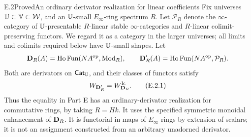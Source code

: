 \begin{claim}{E.2}{Proved}{An ordinary derivator realization for linear coefficients}
Fix universes $\mathbb U\subset\mathbb V\subset\mathcal W$, and an
$\mathbb U$-small $E_\infty$-ring spectrum $R$.  Let $\mathcal P_R$ denote the
$\infty$-category of $\mathbb U$-presentable $R$-linear stable
$\infty$-categories and $R$-linear colimit-preserving functors.  We regard
it as a category in the larger universes; all limits and colimits required
below have $\mathbb U$-small shapes.  Let
\[
 \mathbf D_R(A)=\operatorname{Ho}\operatorname{Fun}(NA^{\mathrm{op}},\operatorname{Mod}_R),\qquad
 \mathbf D'_R(A)=\operatorname{Ho}\operatorname{Fun}(NA^{\mathrm{op}},\mathcal P_R).
\]
Both are derivators on $\mathsf{Cat}_\mathbb U$, and their classes of functors satisfy
\[
                    W_{\mathbf D'_R}=W_{\mathbf D_R}^{\mathrm{lc}}.             \tag{E.2.1}
\]
Thus the equality in Part E has an ordinary-derivator realization for
commutative rings, by taking $R=Hk$.  It uses the specified symmetric
monoidal enhancement of $\mathbf D_R$.  It is functorial in maps of
$E_\infty$-rings by extension of scalars; it is not an assignment
constructed from an arbitrary unadorned derivator.
\end{claim}
